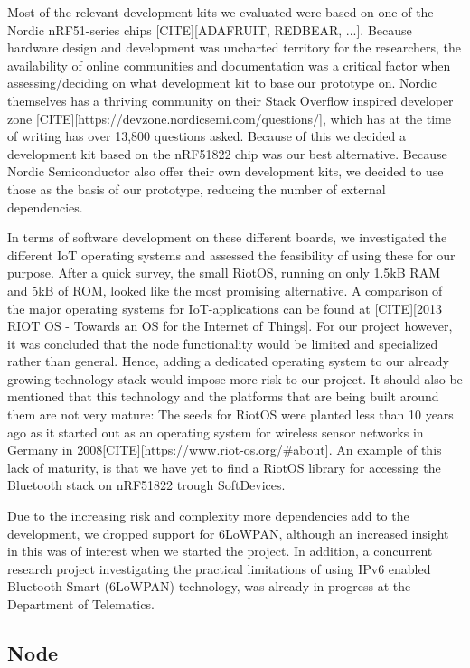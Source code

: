 Most of the relevant development kits we evaluated were based on one of the Nordic nRF51-series chips [CITE][ADAFRUIT, REDBEAR, ...]. Because hardware design and development was uncharted territory for the researchers, the availability of online communities and documentation was a critical factor when assessing/deciding on what development kit to base our prototype on. Nordic themselves has a thriving community on their Stack Overflow inspired developer zone [CITE][https://devzone.nordicsemi.com/questions/], which has at the time of writing has over 13,800 questions asked. Because of this we decided a development kit based on the  nRF51822 chip was our best alternative. Because Nordic Semiconductor also offer their own development kits, we decided to use those as the basis of our prototype, reducing the number of external dependencies. 

In terms of software development on these different boards, we investigated the different IoT operating systems and assessed the feasibility of using these for our purpose. After a quick survey, the small RiotOS, running on only 1.5kB RAM and 5kB of ROM, looked like the most promising alternative. A comparison of the major operating systems for IoT-applications can be found at [CITE][2013 RIOT OS - Towards an OS for the Internet of Things]. For our project however, it was concluded that the node functionality would be limited and specialized rather than general. Hence, adding a dedicated operating system to our already growing technology stack would impose more risk to our project. It should also be mentioned that this technology and the platforms that are being built around them are not very mature: The seeds for RiotOS were planted less than 10 years ago as it started out as an operating system for wireless sensor networks in Germany in 2008[CITE][https://www.riot-os.org/#about]. An example of this lack of maturity, is that we have yet to find a RiotOS library for accessing the Bluetooth stack on nRF51822 trough SoftDevices.

Due to the increasing risk and complexity more dependencies add to the development, we dropped support for 6LoWPAN, although an increased insight in this was of interest when we started the project. In addition, a concurrent research project investigating the practical limitations of using IPv6 enabled Bluetooth Smart (6LoWPAN) technology, was already in progress at the Department of Telematics.


\subsection{Node} %
\label{sub:node}

